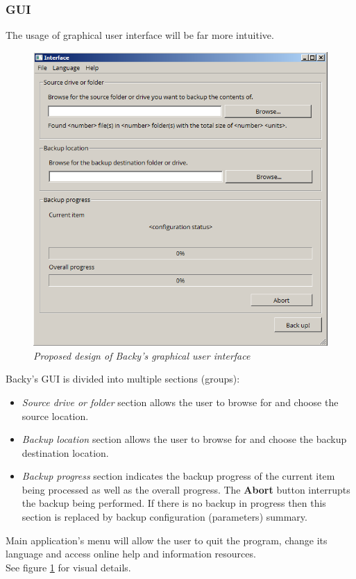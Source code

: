 \documentclass[a4paper]{article}
\begin{document}
      \subsubsection{GUI}
        The usage of graphical user interface will be far more intuitive.
        \begin{figure}[!ht]
         \centering
         \includegraphics[scale=0.7]{img/interface.png}
         \caption{\textit{Proposed design of Backy's graphical user interface}}
         \label{fig:interface}
        \end{figure}
        \par
        Backy's GUI is divided into multiple sections (groups):
        \begin{itemize}
          \item \textit{Source drive or folder} section allows the user to browse for and choose the source location.
          \item \textit{Backup location} section allows the user to browse for and choose the backup destination location.
          \item \textit{Backup progress} section indicates the backup progress of the current item being processed as well as the overall progress. The \textbf{Abort} button interrupts the backup being performed. If there is no backup in progress then this section is replaced by backup configuration (parameters) summary.
        \end{itemize}
        Main application's menu will allow the user to quit the program, change its language and access online help and information resources. \\
        \indent See figure \ref{fig:interface} for visual details.
\end{document}
